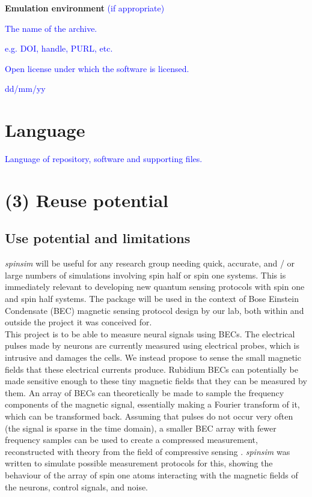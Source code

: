 \documentclass{jors}
\begin{document}
{\bf Emulation environment} \textcolor{blue}{(if appropriate)}

\begin{description}[noitemsep,topsep=0pt]
	\item[Name:] \textcolor{blue}{The name of the archive.}
	\item[Persistent identifier:] \textcolor{blue}{e.g. DOI, handle, PURL, etc.}
	\item[Licence:] \textcolor{blue}{Open license under which the software is licensed.}
	\item[Date published:] \textcolor{blue}{dd/mm/yy}
\end{description}

\section*{Language}

\textcolor{blue}{Language of repository, software and supporting files.}

\section*{(3) Reuse potential}

	\subsection*{Use potential and limitations}
		\emph{spinsim} will be useful for any research group needing quick, accurate, and / or large numbers of simulations involving spin half or spin one systems. This is immediately relevant to developing new quantum sensing protocols with spin one and spin half systems. The package will be used in the context of Bose Einstein Condensate (BEC) magnetic sensing protocol design by our lab, both within and outside the project it was conceived for.\\

		This project is to be able to measure neural signals using BECs. The electrical pulses made by neurons are currently measured using electrical probes, which is intrusive and damages the cells. We instead propose to sense the small magnetic fields that these electrical currents produce. Rubidium BECs can potentially be made sensitive enough to these tiny magnetic fields that they can be measured by them. An array of BECs can theoretically be made to sample the frequency components of the magnetic signal, essentially making a Fourier transform of it, which can be transformed back. Assuming that pulses do not occur very often (the signal is sparse in the time domain), a smaller BEC array with fewer frequency samples can be used to create a compressed measurement, reconstructed with theory from the field of compressive sensing \cite{candes_introduction_2008}. \emph{spinsim} was written to simulate possible measurement protocols for this, showing the behaviour of the array of spin one atoms interacting with the magnetic fields of the neurons, control signals, and noise.\\
\end{document}
